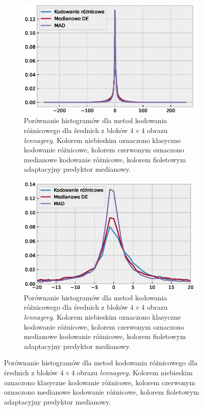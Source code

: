 \documentclass{article}
\begin{document}
\begin{figure}[H]
\begin{subfigure}{.49\textwidth}
  \centering
  \includegraphics[width=.9\linewidth]{images/differential_encoding_histograms_comparison.eps}
  \caption{Porównanie histogramów dla metod kodowania różnicowego dla średnich z bloków $4\times4$ obrazu \emph{lennagrey}. Kolorem niebieskim oznaczono klasyczne kodowanie różnicowe, kolorem czerwonym oznaczono medianowe kodowanie różnicowe, kolorem fioletowym adaptacyjny predyktor medianowy.}
  \label{fig:de_histograms_comparison}
\end{subfigure}
\begin{subfigure}{.49\textwidth}
  \centering
  \includegraphics[width=.9\linewidth]{images/differential_encoding_histograms_comparison_zoom.eps}
  \caption{Porównanie histogramów dla metod kodowania różnicowego dla średnich z bloków $4\times4$ obrazu \emph{lennagrey}. Kolorem niebieskim oznaczono klasyczne kodowanie różnicowe, kolorem czerwonym oznaczono medianowe kodowanie różnicowe, kolorem fioletowym adaptacyjny predyktor medianowy.}
  \label{fig:de_histograms_comparison_zoom}
\end{subfigure}
\end{figure}
\end{document}
